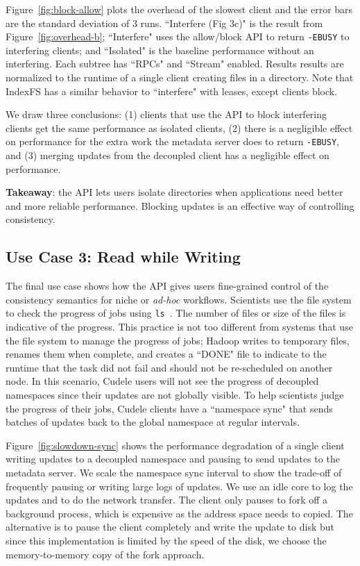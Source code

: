 Figure~\ref{fig:block-allow} plots the overhead of the slowest client and the
error bars are the standard deviation of 3 runs.  ``Interfere (Fig 3c)" is the
result from Figure~\ref{fig:overhead-b}; ``Interfere" uses the allow/block API
to return \texttt{-EBUSY} to interfering clients; and ``Isolated" is the
baseline performance without an interfering. Each subtree has ``RPCs" and
``Stream" enabled.  Results results are normalized to the runtime of a single
client creating files in a directory. Note that IndexFS has a similar behavior
to ``interfere" with leases, except clients block. 

We draw three conclusions: (1) clients that use the API to block interfering
clients  get the same performance as isolated clients, (2) there is a
negligible effect on performance for the extra work the metadata server does to
return \texttt{-EBUSY}, and (3) merging updates from the decoupled client has a
negligible effect on performance.

\textbf{Takeaway}: the API lets users isolate directories when applications
need better and more reliable performance. Blocking updates is an effective way of
controlling consistency.

\subsection{Use Case 3: Read while Writing}

The final use case shows how the API gives users fine-grained control of the
consistency semantics for niche or {\it ad-hoc} workflows.  Scientists use the
file system to check the progress of jobs using \texttt{ls}~\cite{CITEME}. The
number of files or size of the files is indicative of the progress. This
practice is not too different from systems that use the file system to manage
the progress of jobs; Hadoop writes to temporary files, renames them when
complete, and creates a ``DONE" file to indicate to the runtime that the task
did not fail and should not be re-scheduled on another node. In this scenario,
Cudele users will not see the progress of decoupled namespaces since their
updates are not globally visible.  To help scientists judge the progress of
their jobs, Cudele clients have a ``namespace sync" that sends batches of
updates back to the global namespace at regular intervals.

Figure~\ref{fig:slowdown-sync} shows the performance degradation of a single
client writing updates to a decoupled namespace and pausing to send updates to
the metadata server. We scale the namespace sync interval to show the trade-off
of frequently pausing or writing large logs of updates.  We use an idle core to
log the updates and to do the network transfer. The client only pauses to fork
off a background process, which is expensive as the address space needs to
copied. The alternative is to pause the client completely and write the update
to disk but since this implementation is limited by the speed of the disk, we
choose the memory-to-memory copy of the fork approach.

